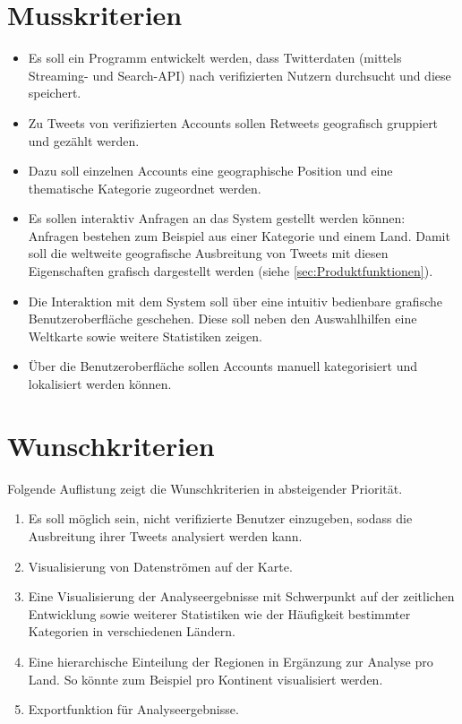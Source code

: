 
\section{Musskriterien}
\begin{itemize}
	\item Es soll ein Programm entwickelt werden, dass Twitterdaten (mittels Streaming- und Search-API) nach verifizierten Nutzern durchsucht und diese speichert.
	\item Zu Tweets von verifizierten Accounts sollen Retweets geografisch gruppiert und gezählt werden.
	\item Dazu soll einzelnen Accounts eine geographische Position und eine thematische Kategorie zugeordnet werden.
	\item Es sollen interaktiv Anfragen an das System gestellt werden können: Anfragen bestehen zum Beispiel aus einer Kategorie und einem Land. Damit soll die weltweite geografische Ausbreitung von Tweets mit diesen Eigenschaften grafisch dargestellt werden (siehe \cref{sec:Produktfunktionen}).
	\item Die Interaktion mit dem System soll über eine intuitiv bedienbare grafische Benutzeroberfläche geschehen. Diese soll neben den Auswahlhilfen eine Weltkarte sowie weitere Statistiken zeigen.
	\item Über die Benutzeroberfläche sollen Accounts manuell kategorisiert und lokalisiert werden können.
\end{itemize}

\section{Wunschkriterien}
Folgende Auflistung zeigt die Wunschkriterien in absteigender Priorität.
\begin{enumerate}
	\item Es soll möglich sein, nicht verifizierte Benutzer einzugeben, sodass die Ausbreitung ihrer Tweets analysiert werden kann.
	\item Visualisierung von Datenströmen auf der Karte.
	\item Eine Visualisierung der Analyseergebnisse mit Schwerpunkt auf der zeitlichen Entwicklung sowie weiterer Statistiken wie der Häufigkeit bestimmter Kategorien in verschiedenen Ländern.
	\item Eine hierarchische Einteilung der Regionen in Ergänzung zur Analyse pro Land. So könnte zum Beispiel pro Kontinent  visualisiert werden.
	\item Exportfunktion für Analyseergebnisse.
\end{enumerate}

